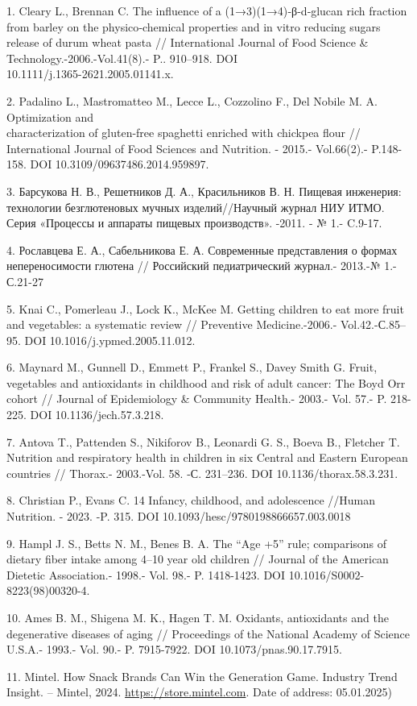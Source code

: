\begin{references}
1. Cleary L., Brennan C. The influence of a (1→3)(1→4)‐β‐d‐glucan rich
fraction from barley on the physico‐chemical properties and in vitro
reducing sugars release of durum wheat pasta // International Journal of
Food Science \& Technology.-2006.-Vol.41(8).- P.. 910--918.
DOI \\10.1111/j.1365-2621.2005.01141.x.

2. Padalino L., Mastromatteo M., Lecce L., Cozzolino F., Del Nobile M.
A. Optimization and \\characterization of gluten-free spaghetti enriched
with chickpea flour // International Journal of Food Sciences and
Nutrition. - 2015.- Vol.66(2).- P.148-158.
DOI 10.3109/09637486.2014.959897.

3. Барсукова Н. В., Решетников Д. А., Красильников В. Н. Пищевая
инженерия: технологии безглютеновых мучных изделий//Научный журнал НИУ
ИТМО. Серия «Процессы и аппараты пищевых производств». -2011. - № 1.-
C.9-17.

4. Рославцева Е. А., Сабельникова Е. А. Современные представления о
формах непереносимости глютена // Российский педиатрический журнал.-
2013.-№ 1.- С.21-27

5. Knai C., Pomerleau J., Lock K., McKee M. Getting children to eat more
fruit and vegetables: a systematic review // Preventive Medicine.-2006.-
Vol.42.-С.85--95. DOI 10.1016/j.ypmed.2005.11.012.

6. Maynard M., Gunnell D., Emmett P., Frankel S., Davey Smith G. Fruit,
vegetables and antioxidants in childhood and risk of adult cancer: The
Boyd Orr cohort // Journal of Epidemiology \& Community Health.- 2003.-
Vol. 57.- P. 218-225. DOI 10.1136/jech.57.3.218.

7. Antova T., Pattenden S., Nikiforov B., Leonardi G. S., Boeva B.,
Fletcher T. Nutrition and respiratory health in children in six Central
and Eastern European countries // Thorax.- 2003.-Vol. 58. -С. 231--236.
DOI 10.1136/thorax.58.3.231.

8. Christian P., Evans C. 14 Infancy, childhood, and adolescence //Human
Nutrition. - 2023. -P. 315. DOI 10.1093/hesc/9780198866657.003.0018

9. Hampl J. S., Betts N. M., Benes B. A. The ``Age +5'' rule; comparisons
of dietary fiber intake among 4--10 year old children // Journal of the
American Dietetic Association.- 1998.- Vol. 98.- P. 1418-1423. DOI
10.1016/S0002-8223(98)00320-4.

10. Ames B. M., Shigena M. K., Hagen T. M. Oxidants, antioxidants and the
degenerative diseases of aging // Proceedings of the National Academy of
Science U.S.A.- 1993.- Vol. 90.- P. 7915-7922. DOI
10.1073/pnas.90.17.7915.

11. Mintel. How Snack Brands Can Win the Generation Game. Industry Trend
Insight. -- Mintel,
2024. \href{https://store.mintel.com/report/how-snack-brands-can-win-the-generation-game}{https://store.mintel.com}.
Date of address: 05.01.2025)
\end{references}

